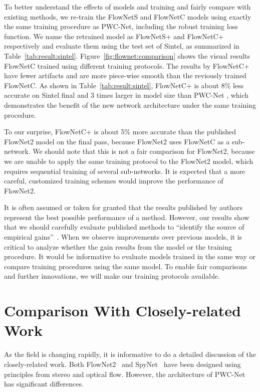 \documentclass[10pt,journal,cspaper,compsoc]{IEEEtran}
\begin{document}
To better understand the effects of models and training and fairly compare with existing methods, we re-train the FlowNetS and FlowNetC models using exactly the same training procedure as PWC-Net, including the robust training loss function. We name the retrained model as FlowNetS+ and FlowNetC+ respectively and evaluate them using the test set of Sintel, as summarized in Table~\ref{tab:result:sintel}. 
Figure~\ref{fig:flownet:comparison} shows the visual results FlowNetC trained using different training protocols. The results by FlowNetC+ have fewer artifacts and are more piece-wise smooth than the reviously trained FlowNetC. 
As shown in Table~\ref{tab:result:sintel}, FlowNetC+ is about 8\% less accurate on Sintel final and 3 times larger in model size than PWC-Net , which demonstrates the benefit of the new network architecture under the same training procedure.

To our surprise, FlowNetC+ is about 5\% more accurate than the published FlowNet2 model on the final pass, because FlowNet2 uses FlowNetC as a sub-network. We should note that this is not a fair comparison for FlowNet2, because we are unable to apply the same training protocol to the FlowNet2 model, which requires sequential training of several sub-networks. It is expected that a more careful, customized training schemes would improve the performance of FlowNet2. 

It is often assumed or taken for granted that the results published by authors represent the best possible performance of a method. However, our results show that we should carefully evaluate published methods to ``identify the source of empirical gains''~\cite{Lipton2018Troubling}. When we observe improvements over previous models, it is critical to analyze whether the gain results from the model or the training procedure. It would be informative to evaluate models trained in the same way or compare training procedures using the same model. 
To enable fair comparisons and further innovations, we will make our training protocols available. 
	
	\section{Comparison With Closely-related Work}	
	As the field is changing rapidly, it is informative to do a detailed discussion of the closely-related work. Both FlowNet2~\cite{Ilg:2016:Flownet2} and SpyNet~\cite{Ranjan:2016:SpyNet} have been designed using principles from stereo and optical flow. However, the architecture of PWC-Net has significant differences. 
	
\end{document}
